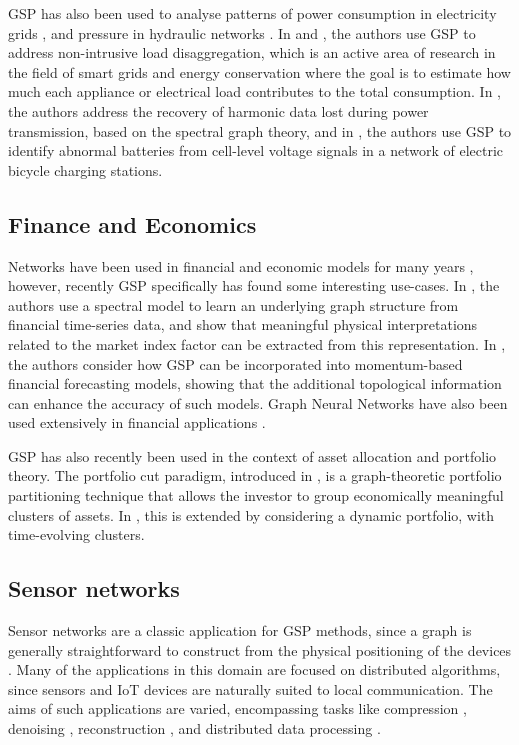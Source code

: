 GSP has also been used to analyse patterns of power consumption in electricity grids \citep{Ramakrishna2021}, and pressure in hydraulic networks \citep{Zhou2022}. In \cite{He2018} and \cite{Zheng2022}, the authors use GSP to address non-intrusive load disaggregation, which is an active area of research in the field of smart grids and energy conservation where the goal is to estimate how much each appliance or electrical load contributes to the total consumption. In \cite{Ying2022}, the authors address the recovery of harmonic data lost during power transmission, based on the spectral graph theory, and in \cite{Wang2022b}, the authors use GSP to identify abnormal batteries from cell-level voltage signals in a network of electric bicycle charging stations. 


\subsection{Finance and Economics}

Networks have been used in financial and economic models for many years \citep{Marti2021}, however, recently GSP specifically has found some interesting use-cases. In \cite{Vinicius2020}, the authors use a spectral model to learn an underlying graph structure from financial time-series data, and show that meaningful physical interpretations related to the market index factor can be extracted from this representation. In \citep{Zhang2023}, the authors consider how GSP can be incorporated into momentum-based financial forecasting models, showing that the additional topological information can enhance the accuracy of such models. Graph Neural Networks have also been used extensively in financial applications \citep{Wang2022c}. 

GSP has also recently been used in the context of asset allocation and portfolio theory. The portfolio cut paradigm, introduced in \citep{Dees2020}, is a graph-theoretic portfolio partitioning technique that allows the investor to group economically meaningful clusters of assets. In \citep{Arroyo2022}, this is extended by considering a dynamic portfolio, with time-evolving clusters. 



\subsection{Sensor networks}

Sensor networks are a classic application for GSP methods, since a graph is generally straightforward to construct from the physical positioning of the devices \citep{Jablonski2017}. Many of the applications in this domain are focused on distributed algorithms, since sensors and IoT devices are naturally suited to local communication. The aims of such applications are varied, encompassing tasks like compression \citep{Zhu2012}, denoising \citep{Tay2021}, reconstruction \citep{Wang2015}, and distributed data processing \citep{Chi2022}. 

